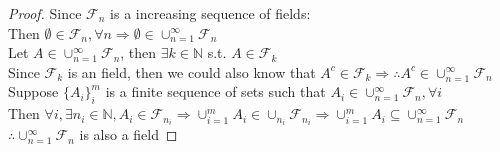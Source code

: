 \documentclass[12pt]{article}
\newenvironment{problem}[2][Problem]{\begin{trivlist}
\item[\hskip \labelsep {\bfseries #1}\hskip \labelsep {\bfseries #2.}]}{\end{trivlist}}
\begin{document}
\begin{problem}{2(a)}
\end{problem}
\begin{proof}
Since $\mathcal{F}_{n}$ is a increasing sequence of fields:\\
Then $\emptyset \in \mathcal{F}_{n}, \forall n \Rightarrow \emptyset \in \cup_{n=1}^{\infty}\mathcal{F}_{n}$\\
Let $A \in \cup_{n=1}^{\infty}\mathcal{F}_{n}$, then $\exists k \in \mathbb{N}$ s.t. $A \in \mathcal{F}_{k}$\\
Since $\mathcal{F}_{k}$ is an field, then we could also know that $A^{c} \in \mathcal{F}_{k} \Rightarrow \therefore A^{c} \in \cup_{n=1}^{\infty}\mathcal{F}_{n}$\\
Suppose $\{A_{i}\}_{i}^{m}$ is a finite sequence of sets such that $A_{i} \in \cup_{n=1}^{\infty}\mathcal{F}_{n}, \forall i$\\
Then $\forall i, \exists n_{i} \in \mathbb{N}, A_{i} \in \mathcal{F}_{n_{i}} \Rightarrow \cup_{i=1}^{m}A_{i} \in \cup_{n_{i}}\mathcal{F}_{n_{i}} \Rightarrow \cup_{i=1}^{m}A_{i} \subseteq \cup_{n=1}^{\infty}\mathcal{F}_{n}$\\
$\therefore \cup_{n=1}^{\infty}\mathcal{F}_{n}$ is also a field
\end{proof}
\end{document}
